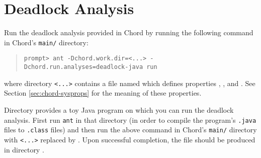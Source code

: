 \section{Deadlock Analysis}
\label{sec:deadlock}

Run the deadlock analysis provided in Chord by running the following command in Chord's {\tt main/} directory:

\begin{quote}
\begin{verbatim}
prompt> ant -Dchord.work.dir=<...> -Dchord.run.analyses=deadlock-java run
\end{verbatim}
\end{quote}

\noindent where directory {\tt <...>} contains a file named  which
defines properties , , and .
See Section \ref{sec:chord-sysprops} for the meaning of these properties.

Directory  provides a toy Java program on which you can run
the deadlock analysis.
First run {\tt ant} in that directory (in order to compile the program's {\tt .java} files to
{\tt .class} files) and then run the above command in Chord's {\tt main/} directory with
{\tt <...>} replaced by .
Upon successful completion, the file  should be produced in directory
.


